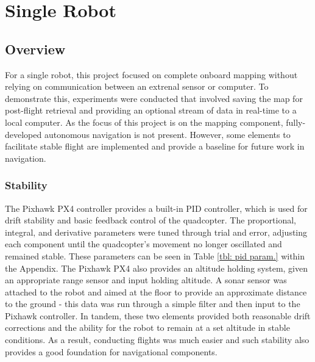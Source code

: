 \documentclass[letterpaper, oneside, 10pt]{report}
\begin{document}
\chapter{Single Robot}

\section{Overview}
For a single robot, this project focused on complete onboard mapping without relying on communication between an extrenal sensor or computer. To demonstrate this, experiments were conducted that involved saving the map for post-flight retrieval and providing an optional stream of data in real-time to a local computer. As the focus of this project is on the mapping component, fully-developed autonomous navigation is not present. However, some elements to facilitate stable flight are implemented and provide a baseline for future work in navigation.

    \subsection{Stability}
    The Pixhawk PX4 controller provides a built-in PID controller, which is used for drift stability and basic feedback control of the quadcopter. The proportional, integral, and derivative parameters were tuned through trial and error, adjusting each component until the quadcopter's movement no longer oscillated and remained stable. These parameters can be seen in Table \ref{tbl: pid param.} within the Appendix. The Pixhawk PX4 also provides an altitude holding system, given an appropriate range sensor and input holding altitude. A sonar sensor was attached to the robot and aimed at the floor to provide an approximate distance to the ground - this data was run through a simple filter and then input to the Pixhawk controller. In tandem, these two elements provided both reasonable drift corrections and the ability for the robot to remain at a set altitude in stable conditions. As a result, conducting flights was much easier and such stability also provides a good foundation for navigational components.
\end{document}
